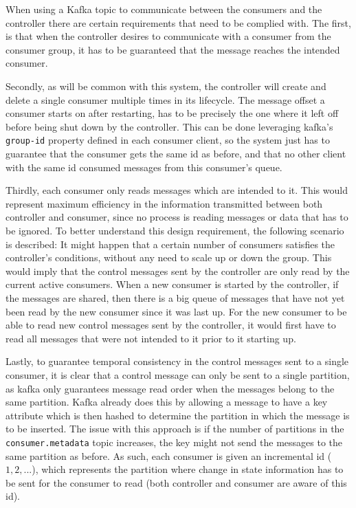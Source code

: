 When using a Kafka topic to communicate between the consumers and the controller
there are certain requirements that need to be complied with. The first, is that
when the controller desires to communicate with a consumer from the consumer
group, it has to be guaranteed that the message reaches the intended consumer. 

Secondly, as will be common with this system, the controller will create and
delete a single consumer multiple times in its lifecycle. The message offset a
consumer starts on after restarting, has to be precisely the one where it left
off before being shut down by the controller. This can be done leveraging
kafka's \lstinline{group-id} property defined in each consumer client, so the
system just has to guarantee that the consumer gets the same id as before, and
that no other client with the same id consumed messages from this consumer's
queue.

Thirdly, each consumer only reads messages which are intended to it. This would
represent maximum efficiency in the information transmitted between both
controller and consumer, since no process is reading messages or data that has
to be ignored. To better understand this design requirement, the following
scenario is described: It might happen that a certain number of consumers
satisfies the controller's conditions, without any need to scale up or down the
group. This would imply that the control messages sent by the controller are
only read by the current active consumers. When a new consumer is started by the
controller, if the messages are shared, then there is a big queue of messages
that have not yet been read by the new consumer since it was last up. For the
new consumer to be able to read new control messages sent by the controller, it
would first have to read all messages that were not intended to it prior to it
starting up.

Lastly, to guarantee temporal consistency in the control messages sent to a
single consumer, it is clear that a control message can only be sent to a single
partition, as kafka only guarantees message read order when the messages belong
to the same partition. Kafka already does this by allowing a message to have a
key attribute which is then hashed to determine the partition in which the
message is to be inserted. The issue with this approach is if the number of
partitions in the \lstinline{consumer.metadata} topic increases, the key might not
send the messages to the same partition as before. As such, each consumer is
given an incremental id ($1, 2, ...$), which represents the partition where
change in state information has to be sent for the consumer to read (both
controller and consumer are aware of this id).

